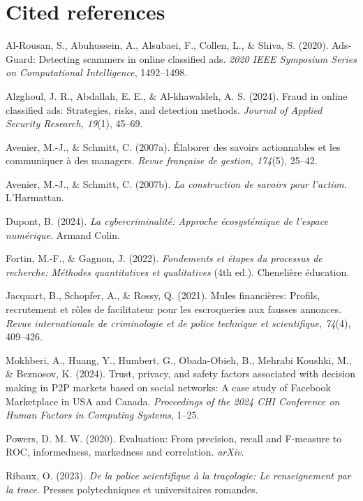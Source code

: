 \documentclass[11pt,a4paper]{article}
\begin{document}
{\newpage}

\appendix

\section*{Cited references}
{\small
\begin{list}{}{
  \setlength{\leftmargin}{1.4em}
  \setlength{\itemindent}{-1.4em}
  \setlength{\itemsep}{0.38em}
  \setlength{\parsep}{0pt}
}
\item Al-Rousan, S., Abuhussein, A., Alsubaei, F., Collen, L., \& Shiva, S. (2020). Ads-Guard: Detecting scammers in online classified ads. \emph{2020 IEEE Symposium Series on Computational Intelligence}, 1492--1498.
\item Alzghoul, J. R., Abdallah, E. E., \& Al-khawaldeh, A. S. (2024). Fraud in online classified ads: Strategies, risks, and detection methods. \emph{Journal of Applied Security Research, 19}(1), 45--69.
\item Avenier, M.-J., \& Schmitt, C. (2007a). Élaborer des savoirs actionnables et les communiquer à des managers. \emph{Revue française de gestion, 174}(5), 25--42.
\item Avenier, M.-J., \& Schmitt, C. (2007b). \emph{La construction de savoirs pour l'action}. L'Harmattan.
\item Dupont, B. (2024). \emph{La cybercriminalité: Approche écosystémique de l'espace numérique}. Armand Colin.
\item Fortin, M.-F., \& Gagnon, J. (2022). \emph{Fondements et étapes du processus de recherche: Méthodes quantitatives et qualitatives} (4th ed.). Chenelière éducation.
\item Jacquart, B., Schopfer, A., \& Rossy, Q. (2021). Mules financières: Profils, recrutement et rôles de facilitateur pour les escroqueries aux fausses annonces. \emph{Revue internationale de criminologie et de police technique et scientifique, 74}(4), 409--426.
\item Mokhberi, A., Huang, Y., Humbert, G., Obada-Obieh, B., Mehrabi Koushki, M., \& Beznosov, K. (2024). Trust, privacy, and safety factors associated with decision making in P2P markets based on social networks: A case study of Facebook Marketplace in USA and Canada. \emph{Proceedings of the 2024 CHI Conference on Human Factors in Computing Systems}, 1--25.
\item Powers, D. M. W. (2020). Evaluation: From precision, recall and F-measure to ROC, informedness, markedness and correlation. \emph{arXiv}.
\item Ribaux, O. (2023). \emph{De la police scientifique à la traçologie: Le renseignement par la trace}. Presses polytechniques et universitaires romandes.

\end{list}}
\end{document}
